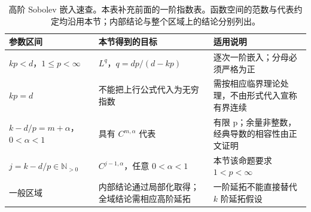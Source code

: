 \begin{table}[htbp]
\centering\small\renewcommand{\arraystretch}{1.18}\setlength{\tabcolsep}{4pt}
\caption[高阶 Sobolev 嵌入速查]{高阶 Sobolev 嵌入速查。本表补充前面的一阶指数表。函数空间的范数与代表约定均沿用本节；内部结论与整个区域上的结论分别列出。}
\label{b1:tab:visual-t13}
\begin{tabularx}{\linewidth}{@{}>{\raggedright\arraybackslash}p{3.1cm}>{\raggedright\arraybackslash}p{4.7cm}>{\raggedright\arraybackslash}X@{}}
\toprule
参数区间 & 本节得到的目标 & 适用说明 \\
\midrule
\(kp<d\)，\(1\le p<\infty\) & \(L^q\)，\(q=dp/(d-kp)\) & 逐次一阶嵌入；分母必须严格为正 \\
\(kp=d\) & 不能把上行公式代入为无穷指数 & 需按相应临界理论处理，不由形式代入宣称有界连续 \\
\(k-d/p=m+\alpha\)，\(0<\alpha<1\) & 具有 \(C^{m,\alpha}\) 代表 & 有限 p；余量非整数，经典导数的相容性由正文证明 \\
\(j=k-d/p\in\mathbb N_{>0}\) & \(C^{j-1,\alpha}\)，任意 \(0<\alpha<1\) & 本节该命题要求 \(1<p<\infty\) \\
一般区域 & 内部结论通过局部化取得；全域结论需相应高阶延拓 & 一阶延拓不能直接替代 \(k\) 阶延拓假设 \\
\bottomrule
\end{tabularx}
\end{table}
